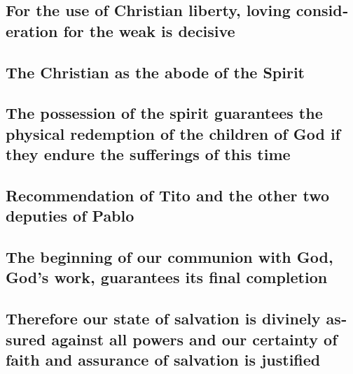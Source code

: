 \begin{paracol}{2}
\begin{otherlanguage}{english}
\hypertarget{for-the-use-of-christian-liberty-loving-consideration-for-the-weak-is-decisive}{%
\subsection{For the use of Christian liberty, loving consideration for
the weak is
decisive}\label{for-the-use-of-christian-liberty-loving-consideration-for-the-weak-is-decisive}}

\hypertarget{the-christian-as-the-abode-of-the-spirit}{%
\subsection{The Christian as the abode of the
Spirit}\label{the-christian-as-the-abode-of-the-spirit}}

\hypertarget{the-possession-of-the-spirit-guarantees-the-physical-redemption-of-the-children-of-god-if-they-endure-the-sufferings-of-this-time}{%
\subsection{The possession of the spirit guarantees the physical
redemption of the children of God if they endure the sufferings of this
time}\label{the-possession-of-the-spirit-guarantees-the-physical-redemption-of-the-children-of-god-if-they-endure-the-sufferings-of-this-time}}

\hypertarget{recommendation-of-tito-and-the-other-two-deputies-of-pablo}{%
\subsection{Recommendation of Tito and the other two deputies of
Pablo}\label{recommendation-of-tito-and-the-other-two-deputies-of-pablo}}

\hypertarget{the-beginning-of-our-communion-with-god-gods-work-guarantees-its-final-completion}{%
\subsection{The beginning of our communion with God, God's work,
guarantees its final
completion}\label{the-beginning-of-our-communion-with-god-gods-work-guarantees-its-final-completion}}

\hypertarget{therefore-our-state-of-salvation-is-divinely-assured-against-all-powers-and-our-certainty-of-faith-and-assurance-of-salvation-is-justified}{%
\subsection{Therefore our state of salvation is divinely assured against
all powers and our certainty of faith and assurance of salvation is
justified}\label{therefore-our-state-of-salvation-is-divinely-assured-against-all-powers-and-our-certainty-of-faith-and-assurance-of-salvation-is-justified}}


\end{otherlanguage}
\end{paracol}

